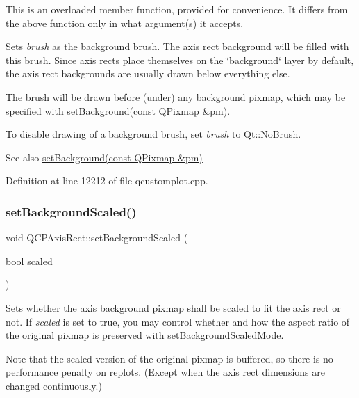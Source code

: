 This is an overloaded member function, provided for convenience. It differs from the above function only in what argument(s) it accepts.

Sets {\itshape brush} as the background brush. The axis rect background will be filled with this brush. Since axis rects place themselves on the \char`\"{}background\char`\"{} layer by default, the axis rect backgrounds are usually drawn below everything else.

The brush will be drawn before (under) any background pixmap, which may be specified with \hyperlink{class_q_c_p_axis_rect_af615ab5e52b8e0a9a0eff415b6559db5}{set\+Background(const Q\+Pixmap \&pm)}.

To disable drawing of a background brush, set {\itshape brush} to Qt\+::\+No\+Brush.

\begin{DoxySeeAlso}{See also}
\hyperlink{class_q_c_p_axis_rect_af615ab5e52b8e0a9a0eff415b6559db5}{set\+Background(const Q\+Pixmap \&pm)} 
\end{DoxySeeAlso}


Definition at line 12212 of file qcustomplot.\+cpp.

\mbox{\label{class_q_c_p_axis_rect_ae6d36c3e0e968ffb991170a018e7b503}} 
\subsubsection{\texorpdfstring{set\+Background\+Scaled()}{setBackgroundScaled()}}
{\footnotesize\ttfamily void Q\+C\+P\+Axis\+Rect\+::set\+Background\+Scaled (\begin{DoxyParamCaption}\item[{bool}]{scaled }\end{DoxyParamCaption})}

Sets whether the axis background pixmap shall be scaled to fit the axis rect or not. If {\itshape scaled} is set to true, you may control whether and how the aspect ratio of the original pixmap is preserved with \hyperlink{class_q_c_p_axis_rect_a5ef77ea829c9de7ba248e473f48f7305}{set\+Background\+Scaled\+Mode}.

Note that the scaled version of the original pixmap is buffered, so there is no performance penalty on replots. (Except when the axis rect dimensions are changed continuously.)

